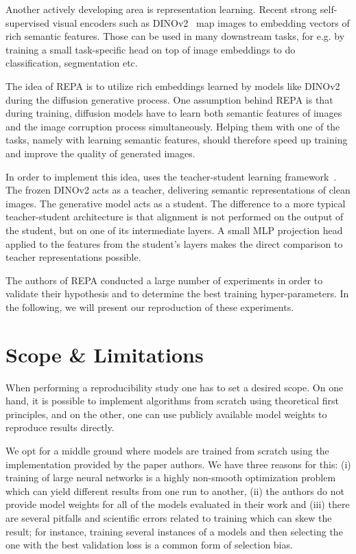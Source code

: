 \documentclass{article}
\begin{document}
Another actively developing area is representation learning. Recent strong self-supervised visual encoders such as DINOv2~\cite{oquab2023dinov2} map images to embedding vectors of rich semantic features. Those can be used in many downstream tasks, for e.g. by training a small task-specific head on top of image embeddings to do classification, segmentation etc.

The idea of REPA is to utilize rich embeddings learned by models like DINOv2 during the diffusion generative process. One assumption behind REPA is that during training, diffusion models have to learn both semantic features of images and the image corruption process simultaneously. Helping them with one of the tasks, namely with learning semantic features, should therefore speed up training and improve the quality of generated images.

In order to implement this idea, \cite{yu2025repa} uses the teacher-student learning framework~\cite{hinton2015distilling}. The frozen DINOv2 acts as a teacher, delivering semantic representations of clean images. The generative model acts as a student. The difference to a more typical teacher-student architecture is that alignment is not performed on the output of the student, but on one of its intermediate layers. A small MLP projection head applied to the features from the student's layers makes the direct comparison to teacher representations possible.

The authors of REPA conducted a large number of experiments in order to validate their hypothesis and to determine the best training hyper-parameters. In the following, we will present our reproduction of these experiments.

\section{Scope \& Limitations}\label{sec:scope}

When performing a reproducibility study one has to set a desired scope. On one hand, it is possible to implement algorithms from scratch using theoretical first principles, and on the other, one can use publicly available model weights to reproduce results directly.

We opt for a middle ground where models are trained from scratch using the implementation provided by the paper authors. We have three reasons for this: (i) training of large neural networks is a highly non-smooth optimization problem which can yield different results from one run to another, (ii) the authors do not provide model weights for all of the models evaluated in their work and (iii) there are several pitfalls and scientific errors related to training which can skew the result; for instance, training several instances of a models and then selecting the one with the best validation loss is a common form of selection bias. %
\end{document}
